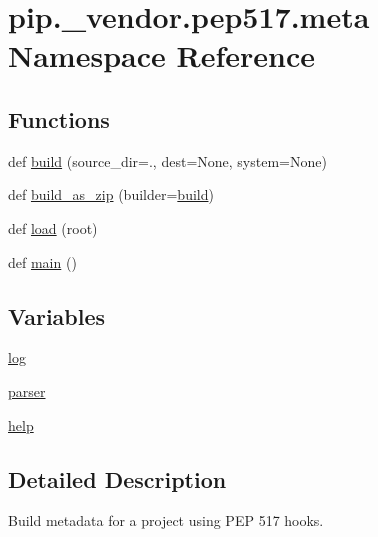 \hypertarget{namespacepip_1_1__vendor_1_1pep517_1_1meta}{}\section{pip.\+\_\+vendor.\+pep517.\+meta Namespace Reference}
\label{namespacepip_1_1__vendor_1_1pep517_1_1meta}
\subsection*{Functions}
\begin{DoxyCompactItemize}
\item 
def \hyperlink{namespacepip_1_1__vendor_1_1pep517_1_1meta_a268d7368d393df7cd613764e1b457110}{build} (source\+\_\+dir=\textquotesingle{}.\textquotesingle{}, dest=None, system=None)
\item 
def \hyperlink{namespacepip_1_1__vendor_1_1pep517_1_1meta_a0f718bf0af37ccfc6b1cf8124f498f9c}{build\+\_\+as\+\_\+zip} (builder=\hyperlink{namespacepip_1_1__vendor_1_1pep517_1_1meta_a268d7368d393df7cd613764e1b457110}{build})
\item 
def \hyperlink{namespacepip_1_1__vendor_1_1pep517_1_1meta_ae5c1c88dc43abec3ab110d0ed1292186}{load} (root)
\item 
def \hyperlink{namespacepip_1_1__vendor_1_1pep517_1_1meta_aa81c6f273bbc1526acb00f0e99fabcc1}{main} ()
\end{DoxyCompactItemize}
\subsection*{Variables}
\begin{DoxyCompactItemize}
\item 
\hyperlink{namespacepip_1_1__vendor_1_1pep517_1_1meta_a39e0eb0e25477e7551186fb7bcb3892f}{log}
\item 
\hyperlink{namespacepip_1_1__vendor_1_1pep517_1_1meta_a8793abd36ebe2982ab377200f6de6d52}{parser}
\item 
\hyperlink{namespacepip_1_1__vendor_1_1pep517_1_1meta_a874b44bbb0a98309d8c0fe9464574f19}{help}
\end{DoxyCompactItemize}


\subsection{Detailed Description}
\begin{DoxyVerb}Build metadata for a project using PEP 517 hooks.
\end{DoxyVerb}
 

